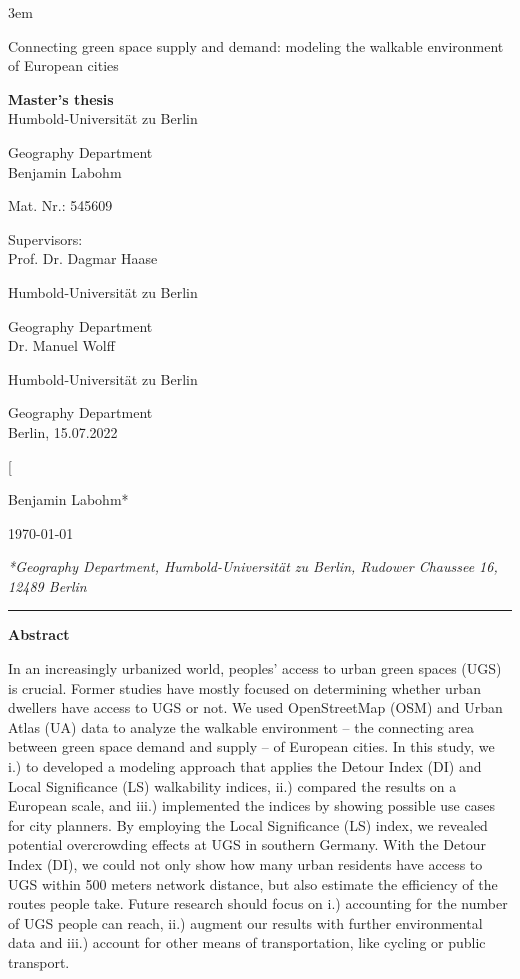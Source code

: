 \documentclass[10pt]{article}
\begin{document}
\emergencystretch 3em
\onecolumn

{\center
\vspace*{5cm}
{\Huge Connecting green space supply and demand: modeling the walkable environment of European cities}
\par\bigskip
\Large{
\textbf{Master's thesis}\\
Humbold-Universit\"at zu Berlin

Geography Department
\\
Benjamin Labohm

Mat. Nr.: 
545609
\vfill
}
}
\large{


Supervisors: \\
Prof. Dr. Dagmar Haase

Humbold-Universit\"at zu Berlin

Geography Department\\


Dr. Manuel Wolff

Humbold-Universit\"at zu Berlin

Geography Department \\

Berlin, 15.07.2022
}

\newpage
\normalsize
\tableofcontents
\newpage
\listoffigures
\newpage

\twocolumn[{\vspace{3ex}
	{\large Benjamin Labohm*\par}\vspace{2ex}
	\today\par\vspace{4ex}}
\textit{\small{*Geography Department, Humbold-Universit\"at zu Berlin, Rudower Chaussee 16, 12489 Berlin}} \\
\smallbreak
\hrule 

\vspace*{.5cm}

\textbf{Abstract}

In an increasingly urbanized world, peoples’ access to urban green spaces (UGS) is crucial. 
Former studies have mostly focused on determining whether urban dwellers have access to UGS or not.
We used OpenStreetMap (OSM) and Urban Atlas (UA) data to analyze the walkable environment – the connecting area between green space demand and supply – of European cities. 
In this study, we i.) to developed a modeling approach that applies the Detour Index (DI) and Local Significance (LS) walkability indices, ii.) compared the results on a European scale, and iii.) implemented the indices by showing possible use cases for city planners.
By employing the Local Significance (LS) index, we revealed potential overcrowding effects at UGS in southern Germany.
With the Detour Index (DI), we could not only show how many urban residents have access to UGS within 500 meters network distance, but also estimate the efficiency of the routes people take. 
Future research should focus on i.) accounting for the number of UGS people can reach, ii.) augment our results with further environmental data and iii.) account for other means of transportation, like cycling or public transport.
\end{document}
